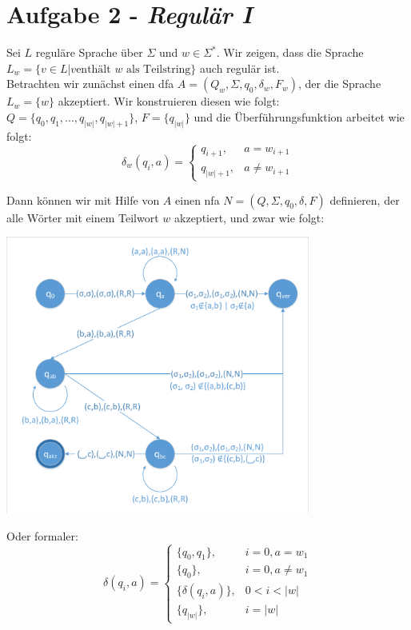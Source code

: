 \documentclass{article}
\begin{document}
\section*{Aufgabe 2 - \textit{Regulär I}}

Sei $L$ reguläre Sprache über $\Sigma$ und $w\in\Sigma^*$. Wir zeigen, dass die Sprache $L_w = \{v\in L | v \text{enthält } w \text{ als Teilstring}\}$ auch regulär ist.\\

Betrachten wir zunächst einen dfa $A = (Q_w, \Sigma, q_0, \delta_w, F_w)$, der die Sprache $L_w = \{w\}$ akzeptiert. Wir konstruieren diesen wie folgt: $Q = \{q_0,q_1,...,q_{|w|}, q_{|w|+1}\}$, $F= \{q_{|w|}\}$ und die Überführungsfunktion arbeitet wie folgt:
\begin{equation}
	\delta_w(q_i, a) = \begin{cases}
	q_{i+1},& a = w_{i+1}\\
	q_{|w| + 1}, &a \neq w_{i+1}
	\end{cases}
\end{equation}


Dann können wir mit Hilfe von $A$ einen nfa $N = (Q,\Sigma,q_0,\delta,F)$ definieren, der alle Wörter mit einem Teilwort $w$ akzeptiert, und zwar wie folgt:

\begin{minipage}{\textwidth}
	\centering \includegraphics[width=0.75\textwidth,page=2,trim={2 2 2 4},clip]{diagramme.pdf}
\end{minipage}

Oder formaler:
\begin{equation}
	\delta(q_i,a) = \begin{cases}
	\{q_0,q_1\}, &i = 0, a = w_1\\
	\{q_0\}, &i=0, a \neq w_1\\
	\{\delta(q_i,a)\}, & 0 < i < |w|\\
	\{q_{|w|}\}, & i = |w|
	\end{cases}
\end{equation}
\end{document}
